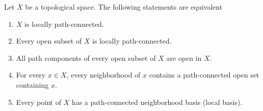 \begin{note}\label{note:characterizations-of-local-path-connectedness}
	Let $X$ be a topological space. The following statements are equivalent
	\begin{enumerate}[label={(\alph*)}]
		\item $X$ is locally path-connected.
		\item Every open subset of $X$ is locally path-connected.
		\item All path components of every open subset of $X$ are open in $X$.
		\item For every $x\in X$, every neighborhood of $x$ contains a path-connected open set containing $x$.
		\item Every point of $X$ has a path-connected neighborhood basis (local basis).
	\end{enumerate}
\end{note}

